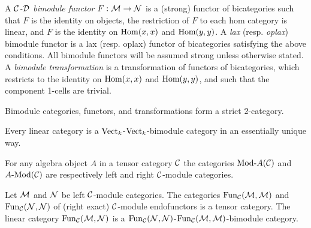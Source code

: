 \documentclass{amsart}
\begin{document}
\begin{definition}		
A {\em $\mathcal C$-$\mathcal D$ bimodule functor} $F:\mathcal M \to \mathcal N$ is a (strong) functor of bicategories such that 
		 $F$ is the identity on objects,
		  the restriction of $F$ to each hom category is linear,
		 and $F$ is the identity on $\operatorname{Hom}(x,x)$ and $\operatorname{Hom}(y,y)$.
A {\em lax} (resp. {\em oplax}) bimodule functor is a lax (resp. oplax) functor of bicategories satisfying the above conditions. All bimodule functors will be assumed strong unless otherwise stated. 
	A {\em bimodule transformation} is a transformation of functors of bicategories, which restricts to the identity on $\operatorname{Hom}(x,x)$ and $\operatorname{Hom}(y,y)$, and such that the component 1-cells are trivial.  
\end{definition}
	
%
Bimodule categories, functors, and transformations form a strict 2-category.

\begin{example}
	Every linear category is a $\mathrm{Vect}_k$-$\mathrm{Vect}_k$-bimodule category in an essentially unique way. 
\end{example}

\begin{example}
	For any algebra object $A$ in a tensor category $\mathcal C$ the categories $\Mod{}{A}(\cC)$ and $\Mod{A}{}(\cC)$ are respectively left and right $\mathcal C$-module categories. 
\end{example}

\begin{example}
	Let $\mathcal M$ and $\mathcal N$ be left $\mathcal C$-module categories. The categories $\operatorname{Fun}_{\mathcal C}(\mathcal M, \mathcal M)$ and $\operatorname{Fun}_{\mathcal C}(\mathcal N, \mathcal N)$ of (right exact) $\mathcal C$-module endofunctors is a tensor category. The linear category $\operatorname{Fun}_{\mathcal C}(\mathcal M, \mathcal N)$ is a $\operatorname{Fun}_{\mathcal C}(\mathcal N, \mathcal N)$-$\operatorname{Fun}_{\mathcal C}(\mathcal M, \mathcal M)$-bimodule category. 
\end{example}
\end{document}
